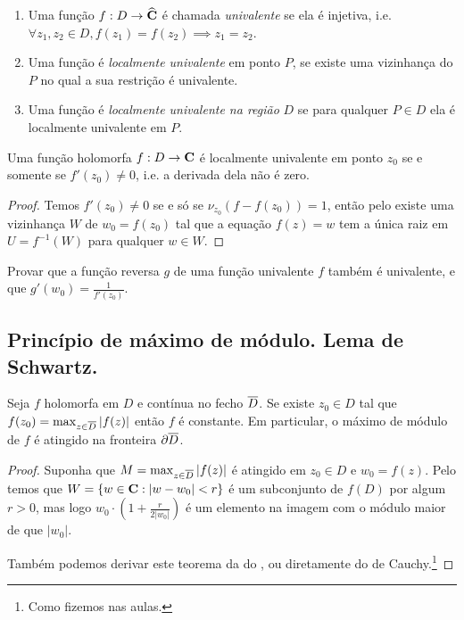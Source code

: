 \begin{defin}
\begin{enumerate}
\item Uma função $f: D\to\widehat{\mathbf{C}}$ é chamada \emph{univalente} se ela é injetiva, i.e.
$\forall z_1,z_2\in D, f(z_1) = f(z_2) \implies z_1 = z_2$.
\item Uma função é \emph{localmente univalente} em ponto $P$, se existe uma vizinhança
do $P$ no qual a sua restrição é univalente.
\item Uma função é \emph{localmente univalente na região} $D$ se para qualquer $P\in D$
ela é localmente univalente em $P$.
\end{enumerate}
\end{defin}

\begin{teorema}
\label{t:univalencia}
Uma função holomorfa $f : D\to \mathbf{C}$ é localmente univalente em ponto $z_0$ se e somente se 
$f'(z_0)\neq 0$, i.e. a derivada dela não é zero.
\end{teorema}
\begin{proof}
Temos $f'(z_0)\neq 0$ se e só se $\nu_{z_0}(f-f(z_0)) = 1$,
então pelo  existe uma vizinhança $W$ de $w_0 = f(z_0)$
tal que a equação $f(z) = w$ tem a única raiz em $U = f^{-1}(W)$
para qualquer $w\in W$.
\end{proof}

\begin{problema}
Provar que a função reversa $g$ de uma função univalente $f$ também é univalente,
e que $g'(w_0) = \frac{1}{f'(z_0)}$.
\end{problema}

\subsection{Princípio de máximo de módulo. Lema de Schwartz.}

\begin{teorema}
\label{t:maximo}
Seja $f$ holomorfa em $D$ e contínua no fecho $\overline{D}$.
Se existe $z_0\in D$ tal que $f(z_0) = \max_{z\in\overline{D}} |f(z)|$ então $f$ é constante.
Em particular, o máximo de módulo de $f$ é atingido na fronteira $\partial\overline{D}$.
\end{teorema}
\begin{proof}
Suponha que $M = \max_{z\in\overline{D}} |f(z)|$ é atingido em $z_0\in D$ e $w_0 = f(z)$.
Pelo  temos que $W = \{ w\in\mathbf{C} : |w-w_0|<r \}$
é um subconjunto de $f(D)$ por algum $r>0$, mas logo
$w_0 \cdot (1+\frac{r}{2|w_0|})$ é um elemento na imagem com o módulo maior
de que $|w_0|$.

Também podemos derivar este teorema da  do ,
ou diretamente do  de Cauchy.\footnote{Como fizemos nas aulas.}
\end{proof}


